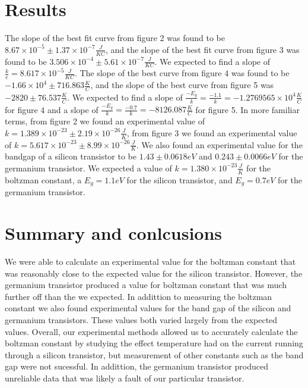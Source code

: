 \documentclass[12pt,letterpaper,twocolumn]{article}
\begin{document}
\section{Results}
The slope of the best fit curve from figure 2 was found to be $8.67 \times 10^{-5} \pm 1.37 \times 10^{-7} \frac{J}{KC}$, and the slope of the best fit curve from figure 3 was found to be $3.506 \times 10^{-4} \pm 5.61\times 10^{-7}\frac{J}{KC}$. We expected to find a slope of $\frac{k}{e} = 8.617 \times 10^{-5}\frac{J}{KC}$. The slope of the best curve from figure 4 was found to be $-1.66 \times 10^{4} \pm 716.863 \frac{K}{C}$, and the slope of the best curve from figure 5 was $-2820 \pm 76.537 \frac{K}{C}$. We expected to find a slope of $\frac{-E_g}{k} = \frac{-1.1}{k} = -1.2769565 \times 10^{4} \frac{K}{C}$ for figure 4 and a slope of $\frac{-E_g}{k} = \frac{-0.7}{k} = -8126.087 \frac{K}{C}$ for figure 5.
In more familiar terms, from figure 2 we found an experimental value of $k = 1.389 \times 10^{-23} \pm 2.19 \times 10^{-26} \frac{J}{K}$, from figure 3 we found an experimental value of $k = 5.617\times 10^{-23} \pm 8.99 \times 10^{-26}\frac{J}{K}$. We also found an experimental value for the bandgap of a silicon transistor to be $1.43 \pm 0.0618 eV$ and $0.243 \pm 0.0066 eV$ for the germanium transistor. We expected a value of $k = 1.380 \times 10^{-23} \frac{J}{K}$ for the boltzman constant, a $E_g = 1.1eV$ for the silicon transistor, and $E_g = 0.7 eV$ for the germanium transistor.


\section{Summary and conlcusions}
	We were able to calculate an experimental value for the boltzman constant that was reasonably close to the expected value for the silicon transistor. However, the germanium transistor produced a value for boltzman constant that was much further off than the we expected. In addittion to measuring the boltzman constant we also found experimental values for the band gap of the silicon and germanium transistors. These values both varied largely from the expected values. Overall, our experimental methods allowed us to accurately calculate the boltzman constant by studying the effect temperature had on the current running through a silicon transistor, but measurement of other constants such as the band gap were not sucessful. In addittion, the germanium transistor produced unreliable data that was likely a fault of our particular transistor.
\end{document}
